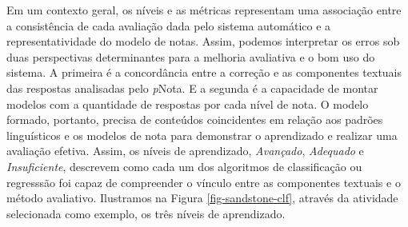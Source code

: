 Em um contexto geral, os níveis e as métricas representam uma associação entre a consistência de cada avaliação dada pelo sistema automático e a representatividade do modelo de notas. Assim, podemos interpretar os erros sob duas perspectivas determinantes para a melhoria avaliativa e o bom uso do sistema. A primeira é a concordância entre a correção e as componentes textuais das respostas analisadas pelo \textit{p}Nota. E a segunda é a capacidade de montar modelos com a quantidade de respostas por cada nível de nota. O modelo formado, portanto, precisa de conteúdos coincidentes em relação aos padrões linguísticos e os modelos de nota para demonstrar o aprendizado e realizar uma avaliação efetiva. Assim, os níveis de aprendizado, \textit{Avançado}, \textit{Adequado} e \textit{Insuficiente}, descrevem como cada um dos algoritmos de classificação ou regresssão foi capaz de compreender o vínculo entre as componentes textuais e o método avaliativo. Ilustramos na Figura \ref{fig-sandstone-clf}, através da atividade selecionada como exemplo, os três níveis de aprendizado.

